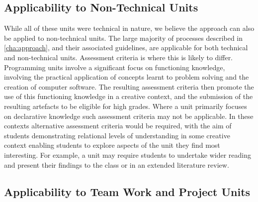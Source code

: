 \subsection{Applicability to Non-Technical Units} %
\label{sub:non_technical_units}


While all of these units were technical in nature, we believe the approach can also be applied to non-technical units. The large majority of processes described in \cref{cha:approach}, and their associated guidelines, are applicable for both technical and non-technical units. Assessment criteria is where this is likely to differ. Programming units involve a significant focus on functioning knowledge, involving the practical application of concepts learnt to problem solving and the creation of computer software. The resulting assessment criteria then promote the use of this functioning knowledge in a creative context, and the submission of the resulting artefacts to be eligible for high grades. Where a unit primarily focuses on declarative knowledge such assessment criteria may not be applicable. In these contexts alternative assessment criteria would be required, with the aim of students demonstrating relational levels of understanding in some creative context enabling students to explore aspects of the unit they find most interesting. For example, a unit may require students to undertake wider reading and present their findings to the class or in an extended literature review.

\subsection{Applicability to Team Work and Project Units} %
\label{sub:applic}


